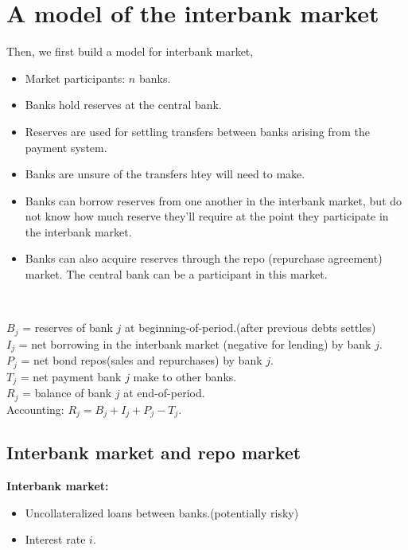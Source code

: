 \section{A model of the interbank market}

Then, we first build a model for interbank market,
\begin{itemize}
    \item Market participants: $n$ banks.
    \item Banks hold reserves at the central bank.
    \item Reserves are used for settling transfers between banks arising from the payment system.
    \item Banks are unsure of the transfers htey will need to make.
    \item Banks can borrow reserves from one another in the interbank market,
    but do not know how much reserve they'll require at the point they participate in the interbank market.
    \item Banks can also acquire reserves through the repo (repurchase
    agreement) market. The central bank can be a participant in
    this market.
\end{itemize}

\begin{note}
    \ 

    $B_j$ = reserves of bank $j$ at beginning-of-period.(after previous debts settles) \\
    $I_j$ = net borrowing in the interbank market (negative for
    lending) by bank $j$. \\
    $P_j$ = net bond repos(sales and repurchases) by bank $j$. \\
    $T_j$ = net payment bank $j$ make to other banks. \\
    $R_j$ = balance of bank $j$ at end-of-period. \\
    Accounting: $R_j = B_j + I_j + P_j - T_j$.
\end{note}

\subsection{Interbank market and repo market}
\textbf{Interbank market:}
\begin{itemize}
    \item Uncollateralized loans between banks.(potentially risky)
    \item Interest rate $i$.
\end{itemize}

